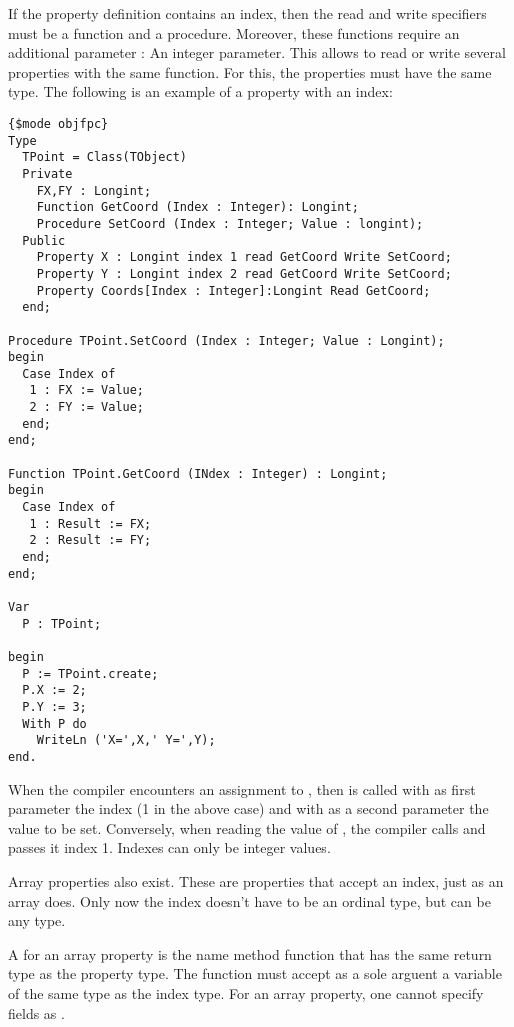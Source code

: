 If the property definition contains an index,  then the read and write
specifiers must be a function and a procedure. Moreover, these functions
require an additional parameter : An integer parameter. This allows to read
or write several properties with the same function. For this, the properties
must have the same type.
The following is an example of a property with an index:
\begin{verbatim}
{$mode objfpc}
Type 
  TPoint = Class(TObject)
  Private
    FX,FY : Longint;
    Function GetCoord (Index : Integer): Longint;
    Procedure SetCoord (Index : Integer; Value : longint);
  Public
    Property X : Longint index 1 read GetCoord Write SetCoord;
    Property Y : Longint index 2 read GetCoord Write SetCoord;
    Property Coords[Index : Integer]:Longint Read GetCoord;
  end;

Procedure TPoint.SetCoord (Index : Integer; Value : Longint);
begin
  Case Index of
   1 : FX := Value;
   2 : FY := Value;
  end;
end;

Function TPoint.GetCoord (INdex : Integer) : Longint;
begin
  Case Index of
   1 : Result := FX;
   2 : Result := FY;
  end;
end;

Var 
  P : TPoint;

begin
  P := TPoint.create;
  P.X := 2;
  P.Y := 3;
  With P do
    WriteLn ('X=',X,' Y=',Y);
end.
\end{verbatim}
When the compiler encounters an assignment to , then 
is called with as first parameter the index (1 in the above case) and with
as a second parameter the value to be set.
Conversely, when reading the value of , the compiler calls
 and passes it index 1.
Indexes can only be integer values.

Array properties also exist. These are properties that accept an
index, just as an array does. Only now the index doesn't have to be an
ordinal type, but can be any type.

A  for an array property is the name method function
that has the same return type as the property type.
The function must accept as a sole arguent a variable of the same type as
the index type. For an array property, one cannot specify fields as .

